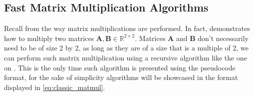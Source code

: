 
\renewcommand{\arraystretch}{0.8} %

\subsection{Fast Matrix Multiplication Algorithms} \label{sec:Fast Matrix Multiplication Algorithms}

    Recall from  the way matrix multiplications are
    performed. In fact,  demonstrates how to multiply
    two matrices $\mathbf{A, B} \in \mathbb{R}^{2\times2}$. Matrices $\mathbf{A}$
    and $\mathbf{B}$ don't necessarily need to be of size 2 by 2, as long as they
    are of a size that is a multiple of 2, we can perform such matrix multiplication
    using a recursive algorithm like the one on . This
    is the only time such algorithm is presented using the pseudocode format, for
    the sake of simplicity algorithms will be showcased in the format displayed in
    \ref{eq:classic_matmul}.

